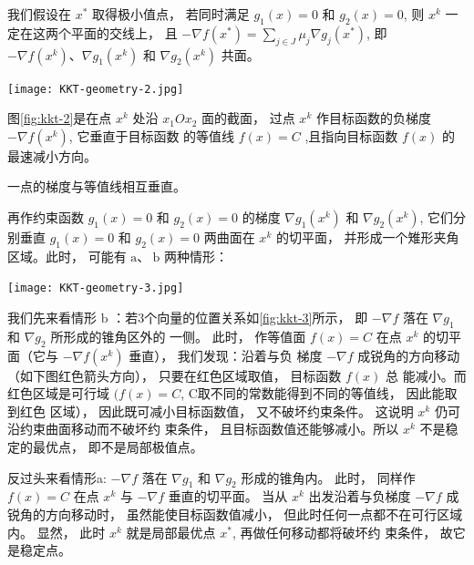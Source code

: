 我们假设在 $ {x}^{*} $ 取得极小值点， 若同时满足 $ g_{1}({x})=0 $ 和 $ g_{2}({x})=0 $, 则 $ {x}^{k} $ 一定在这两个平面的交线上， 且 $ -\nabla f\left({x}^{*}\right)=\sum_{j \in J} \mu_{j} \nabla g_{j}\left({x}^{*}\right) $, 即 $ -\nabla f\left({x}^{k}\right) 、 \nabla g_{1}\left({x}^{k}\right) $ 和 $ \nabla g_{2}\left({x}^{k}\right) $ 共面。

\begin{FigureCenter}{}
    \label{fig:kkt-2}
    \texttt{[image: KKT-geometry-2.jpg]}
\end{FigureCenter}

图\ref{fig:kkt-2}是在点 $ {x}^{k} $ 处沿 $ x_{1} O x_{2} $ 面的截面， 过点 $ {x}^{k} $ 作目标函数的负梯度 $ -\nabla f\left({x}^{k}\right) $, 它垂直于目标函数 的等值线 $ f({x})=C $ ,且指向目标函数 $ f({x}) $ 的最速减小方向。

\begin{corollary}
    一点的梯度与等值线相互垂直。
\end{corollary}

再作约束函数 $ g_{1}({x})=0 $ 和 $ g_{2}({x})=0 $ 的梯度 $ \nabla g_{1}\left({x}^{k}\right) $ 和 $ \nabla g_{2}\left({x}^{k}\right) $, 它们分别垂直 $ g_{1}({x})=0 $ 和 $ g_{2}({x})=0 $ 两曲面在 $ {x}^{k} $ 的切平面， 并形成一个雉形夹角区域。此时， 可能有 $ \mathrm{a} 、 \mathrm{~b} $ 两种情形：

\begin{FigureCenter}{}
    \label{fig:kkt-3}
    \texttt{[image: KKT-geometry-3.jpg]}
\end{FigureCenter}

我们先来看情形 $\mathrm{b}$ ：若3个向量的位置关系如\ref{fig:kkt-3}所示， 即 $-\nabla f$ 落在 $\nabla g_{1}$ 和 $\nabla g_{2}$ 所形成的锥角区外的 一侧。 此时， 作等值面 $f({x})=C$ 在点 ${x}^{k}$ 的切平面（它与 $-\nabla f\left({x}^{k}\right)$ 垂直）， 我们发现：沿着与负 梯度 $-\nabla f$ 成锐角的方向移动（如下图红色箭头方向）， 只要在红色区域取值， 目标函数 $f({x})$ 总 能减小。而红色区域是可行域 $(f({x})=C$, C取不同的常数能得到不同的等值线， 因此能取到红色 区域）， 因此既可减小目标函数值， 又不破坏约束条件。 这说明 ${x}^{k}$ 仍可沿约束曲面移动而不破坏约 束条件， 且目标函数值还能够减小。所以 ${x}^{k}$ 不是稳定的最优点， 即不是局部极值点。

反过头来看情形a: $ -\nabla f $ 落在 $ \nabla g_{1} $ 和 $ \nabla g_{2} $ 形成的锥角内。 此时， 同样作 $ f({x})=C $ 在点 $ {x}^{k} $ 与 $ -\nabla f $ 垂直的切平面。 当从 $ {x}^{k} $ 出发沿着与负梯度 $ -\nabla f $ 成锐角的方向移动时， 虽然能使目标函数值减小， 但此时任何一点都不在可行区域内。 显然， 此时 $ {x}^{k} $ 就是局部最优点 $ {x}^{*} $, 再做任何移动都将破坏约 束条件， 故它是稳定点。

